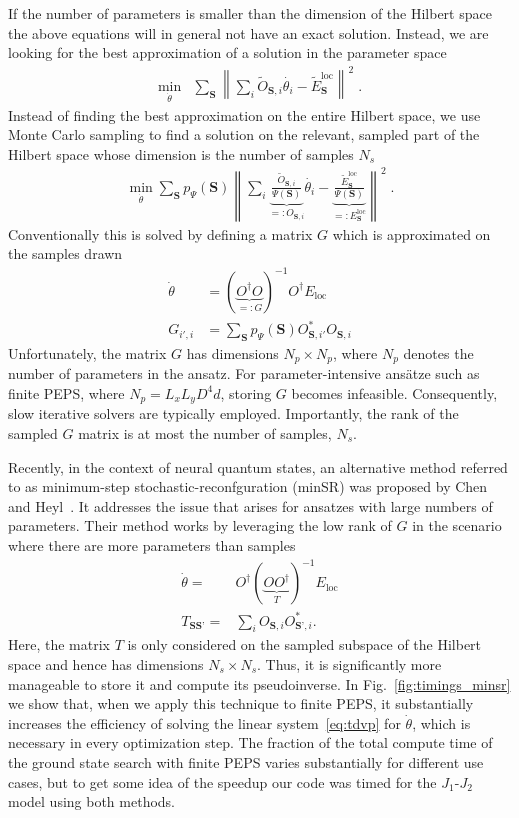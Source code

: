 \documentclass[aps,notitlepage,twocolumn,nofootinbib,superscriptaddress,pra,10pt]{revtex4-2}
\newcommand{\norm}[1]{\left\lVert#1\right\rVert}
\begin{document}
If the number of parameters is smaller than the dimension of the Hilbert space the above equations will in general not have an exact solution. Instead, we are looking for the best approximation of a solution in the parameter space
\begin{align}
\min_{\dot{\theta}}& \sum_\mathbf{S} \norm{\sum_i\tilde{O}_{\textbf{S},i} \dot{\theta_i} - \tilde{E}^\text{loc}_\textbf{S}}^2\;.
\end{align}
Instead of finding the best approximation on the entire Hilbert space, we use Monte Carlo sampling to find a solution on the relevant, sampled part of the Hilbert space whose dimension is the number of samples $N_s$
\begin{align}
\min_{\dot{\theta}}\sum_\textbf{S} p_\Psi(\textbf{S}) \norm{\sum_i\underbrace{\frac{\tilde{O}_{\textbf{S},i}}{\Psi(\textbf{S})}}_{=:O_{\textbf{S},i}} \dot{\theta_i} - \underbrace{\frac{\tilde{E}^\text{loc}_\textbf{S}}{\Psi(\textbf{S})}}_{=:E^\text{loc}_\textbf{S}}}^2\;.
\end{align}
Conventionally this is solved by defining a matrix $G$ which is approximated on the samples drawn
\begin{align}
    \dot{\theta} &= (\underbrace{O^\dag O}_{=:G})^{-1} O^\dag E_\text{loc} \label{eq:tdvp_slow}\\
    G_{i',i} &= \sum_\textbf{S} p_{\Psi}(\textbf{S}) O^*_{\textbf{S},i'} O_{\textbf{S},i}
\end{align}
%
Unfortunately, the matrix $G$ has dimensions $N_p \times N_p$, where $N_p$ denotes the number of parameters in the ansatz. For parameter-intensive ansätze such as finite PEPS, where $N_p = L_x L_y D^4 d$, storing $G$ becomes infeasible. Consequently, slow iterative solvers are typically employed. Importantly, the rank of the sampled $G$ matrix is at most the number of samples, $N_s$.

Recently, in the context of neural quantum states, an alternative method referred to as minimum-step
stochastic-reconfguration (minSR) was
proposed by Chen and Heyl~\cite{chen2024minSR}. It addresses the issue that arises for ansatzes with large numbers of parameters.
Their method works by leveraging the low rank of $G$ in the scenario where there are more parameters than samples
\begin{align}
    \dot{\theta} =& O^\dag (\underbrace{O O^\dag}_T)^{-1}  E_\text{loc} \label{eq:tdvp_fast}\\
    T_{\textbf{S}\textbf{S'}} =& \sum_i O_{\textbf{S},i} O^*_{\textbf{S'},i}.
\end{align}
Here, the matrix $T$ is only considered on the sampled subspace of the Hilbert space and hence has dimensions $N_s \times N_s$. 
Thus, it is significantly more manageable to store it and compute its pseudoinverse. 
In Fig.~\ref{fig:timings_minsr} we show that, 
when we apply this technique to finite PEPS, 
it substantially increases the efficiency of solving the linear system~\eqref{eq:tdvp} for $\dot{\theta}$, which is necessary in every optimization step.
The fraction of the total compute time of the ground state search with finite PEPS varies substantially for different use cases, but to get some idea of the speedup our code was timed for the $J_1$-$J_2$ model using both methods.
\end{document}
